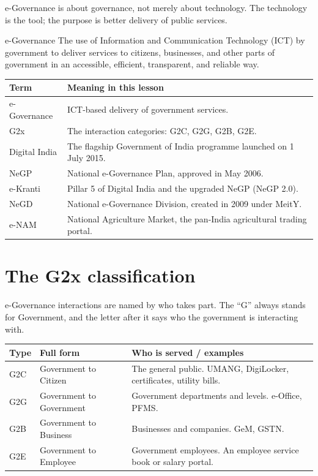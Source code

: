 e-Governance is about governance, not merely about technology. The
technology is the tool; the purpose is better delivery of public services.

\begin{definitionbox}{e-Governance}
The use of Information and Communication Technology (ICT) by government to
deliver services to citizens, businesses, and other parts of government in
an accessible, efficient, transparent, and reliable way.
\end{definitionbox}

\begin{center}
\begin{tabular}{p{}p{}}
\toprule
\textbf{Term} & \textbf{Meaning in this lesson} \\
\midrule
e-Governance & ICT-based delivery of government services. \\
G2x & The interaction categories: G2C, G2G, G2B, G2E. \\
Digital India & The flagship Government of India programme launched on 1 July 2015. \\
NeGP & National e-Governance Plan, approved in May 2006. \\
e-Kranti & Pillar 5 of Digital India and the upgraded NeGP (NeGP 2.0). \\
NeGD & National e-Governance Division, created in 2009 under MeitY. \\
e-NAM & National Agriculture Market, the pan-India agricultural trading portal. \\
\bottomrule
\end{tabular}
\end{center}

\section{The G2x classification}
e-Governance interactions are named by who takes part. The ``G'' always
stands for Government, and the letter after it says who the government is
interacting with.

\begin{center}
\begin{tabular}{p{}p{}p{}}
\toprule
\textbf{Type} & \textbf{Full form} & \textbf{Who is served / examples} \\
\midrule
G2C & Government to Citizen & The general public. UMANG, DigiLocker, certificates, utility bills. \\
G2G & Government to Government & Government departments and levels. e-Office, PFMS. \\
G2B & Government to Business & Businesses and companies. GeM, GSTN. \\
G2E & Government to Employee & Government employees. An employee service book or salary portal. \\
\bottomrule
\end{tabular}
\end{center}

